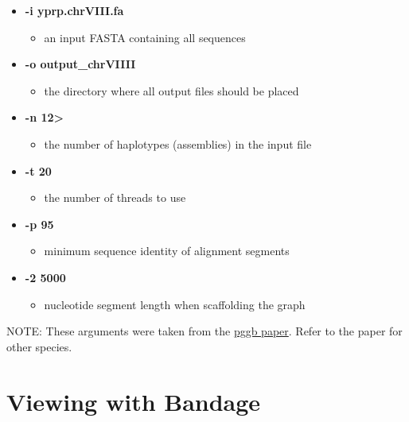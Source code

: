 \documentclass[
]{book}
\providecommand{\tightlist}{%
  \setlength{\itemsep}{0pt}\setlength{\parskip}{0pt}}
\begin{document}
\begin{itemize}
\tightlist
\item
  \textbf{-i yprp.chrVIII.fa}

  \begin{itemize}
  \tightlist
  \item
    an input FASTA containing all sequences
  \end{itemize}
\item
  \textbf{-o output\_chrVIIII}

  \begin{itemize}
  \tightlist
  \item
    the directory where all output files should be placed
  \end{itemize}
\item
  \textbf{-n 12\textgreater{}}

  \begin{itemize}
  \tightlist
  \item
    the number of haplotypes (assemblies) in the input file
  \end{itemize}
\item
  \textbf{-t 20}

  \begin{itemize}
  \tightlist
  \item
    the number of threads to use
  \end{itemize}
\item
  \textbf{-p 95}

  \begin{itemize}
  \tightlist
  \item
    minimum sequence identity of alignment segments
  \end{itemize}
\item
  \textbf{-2 5000}

  \begin{itemize}
  \tightlist
  \item
    nucleotide segment length when scaffolding the graph
  \end{itemize}
\end{itemize}

NOTE: These arguments were taken from the \href{https://github.com/pangenome/pggb-paper/blob/main/workflows/AllSpecies.md}{pggb paper}. Refer to the paper for other species.

\hypertarget{viewing-with-bandage-2}{%
\section{Viewing with Bandage}\label{viewing-with-bandage-2}}
\end{document}
